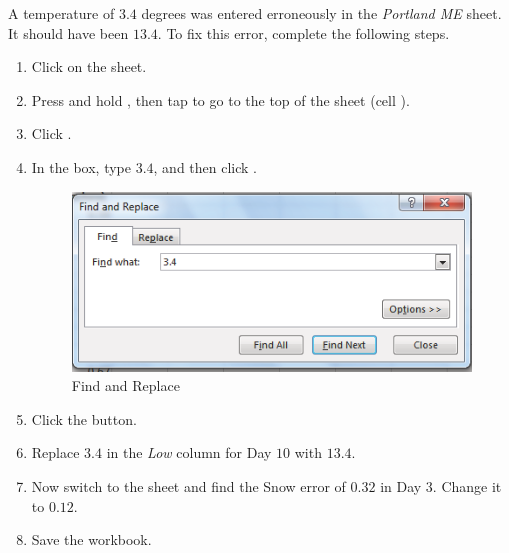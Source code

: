 A temperature of $ 3.4 $ degrees was entered erroneously in the \textit{Portland ME} sheet. It should have been $ 13.4 $. To fix this error, complete the following steps.

\begin{enumbox}
	\begin{enumerate}
		\item Click on the  sheet.
		\item Press and hold , then tap  to go to the top of the sheet (cell ).
		\item Click .
		\item In the  box, type $ 3.4 $, and then click .
	
		\begin{figure}[H]
			\centering
			\includegraphics[width=\maxwidth{.95\linewidth}]{gfx/ch05_fig06}
			\caption{Find and Replace}
			\label{05:fig06}
		\end{figure}

		\item Click the  button.
		\item Replace $ 3.4 $ in the \textit{Low} column for Day $ 10 $ with $ 13.4 $.
		\item Now switch to the  sheet and find the Snow error of $ 0.32 $ in Day $ 3 $. Change it to $ 0.12 $.
		\item Save the  workbook.
	\end{enumerate}
\end{enumbox}
	
